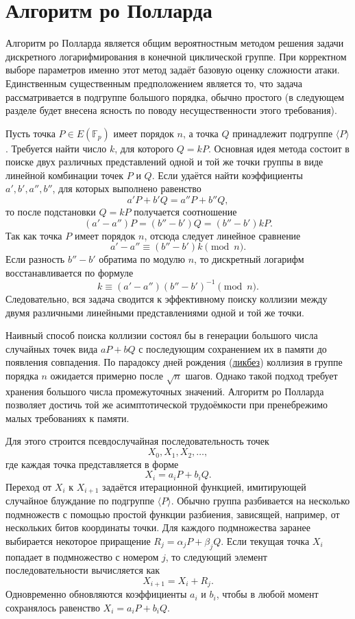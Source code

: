 \section{Алгоритм ро Полларда}

Алгоритм ро Полларда является общим вероятностным методом решения задачи дискретного логарифмирования в конечной циклической группе. При корректном выборе параметров именно этот метод задаёт базовую оценку сложности атаки. Единственным существенным предположением является то, что задача рассматривается в подгруппе большого порядка, обычно простого (в следующем разделе будет внесена ясность по поводу несущественности этого требования).

Пусть точка $P \in E(\mathbb{F}_p)$ имеет порядок $n$, а точка $Q$ принадлежит подгруппе $\langle P\rangle$. Требуется найти число $k$, для которого $Q=kP$. Основная идея метода состоит в поиске двух различных представлений одной и той же точки группы в виде линейной комбинации точек $P$ и $Q$. Если удаётся найти коэффициенты $a',b',a'',b''$, для которых выполнено равенство
\[
a'P+b'Q=a''P+b''Q,
\]
то после подстановки $Q=kP$ получается соотношение
\[
(a'-a'')P=(b''-b')Q=(b''-b')kP.
\]
Так как точка $P$ имеет порядок $n$, отсюда следует линейное сравнение
\[
a'-a''\equiv (b''-b')k \pmod n.
\]
Если разность $b''-b'$ обратима по модулю $n$, то дискретный логарифм восстанавливается по формуле
\[
k\equiv (a'-a'')(b''-b')^{-1} \pmod n.
\]
Следовательно, вся задача сводится к эффективному поиску коллизии между двумя различными линейными представлениями одной и той же точки.

Наивный способ поиска коллизии состоял бы в генерации большого числа случайных точек вида $aP+bQ$ с последующим сохранением их в памяти до появления совпадения. По парадоксу дней рождения (\href{https://ru.wikipedia.org/wiki/%D0%9F%D0%B0%D1%80%D0%B0%D0%B4%D0%BE%D0%BA%D1%81_%D0%B4%D0%BD%D0%B5%D0%B9_%D1%80%D0%BE%D0%B6%D0%B4%D0%B5%D0%BD%D0%B8%D1%8F}{ликбез}) коллизия в группе порядка $n$ ожидается примерно после $\sqrt{n}$ шагов. Однако такой подход требует хранения большого числа промежуточных значений. Алгоритм ро Полларда позволяет достичь той же асимптотической трудоёмкости при пренебрежимо малых требованиях к памяти.

Для этого строится псевдослучайная последовательность точек
\[
X_0,X_1,X_2,\dots,
\]
где каждая точка представляется в форме
\[
X_i=a_iP+b_iQ.
\]
Переход от $X_i$ к $X_{i+1}$ задаётся итерационной функцией, имитирующей случайное блуждание по подгруппе $\langle P\rangle$. Обычно группа разбивается на несколько подмножеств с помощью простой функции разбиения, зависящей, например, от нескольких битов координаты точки. Для каждого подмножества заранее выбирается некоторое приращение $R_j=\alpha_jP+\beta_jQ$. Если текущая точка $X_i$ попадает в подмножество с номером $j$, то следующий элемент последовательности вычисляется как
\[
X_{i+1}=X_i+R_j.
\]
Одновременно обновляются коэффициенты $a_i$ и $b_i$, чтобы в любой момент сохранялось равенство $X_i=a_iP+b_iQ$.

